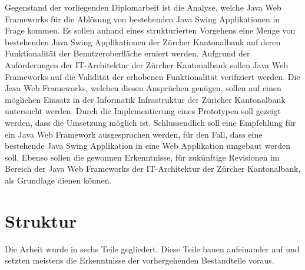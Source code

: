   Gegenstand der vorliegenden Diplomarbeit ist die Analyse, welche Java Web
  Frameworks für die Ablösung von bestehenden Java Swing Applikationen in Frage
  kommen. Es sollen anhand eines strukturierten Vorgehens eine Menge von
  bestehenden Java Swing Applikationen der Zürcher Kantonalbank auf deren
  Funktionalität der Benutzeroberfläche eruiert werden. Aufgrund der
  Anforderungen der IT-Architektur der Zürcher Kantonalbank sollen Java Web
  Frameworks auf die Validität der erhobenen Funktionalität verifiziert
  werden. Die Java Web Frameworks, welchen diesen Ansprüchen genügen, sollen
  auf einen möglichen Einsatz in der Informatik Infrastruktur der Züricher
  Kantonalbank untersucht werden. Durch die Implementierung eines Prototypen
  soll gezeigt werden, dass die Umsetzung möglich ist. Schlussendlich soll eine
  Empfehlung für ein Java Web Framework ausgesprochen werden, für den Fall,
  dass eine bestehende Java Swing Applikation in eine Web Applikation umgebaut
  werden soll. Ebenso sollen die gewonnen Erkenntnisse, für zukünftige
  Revisionen im Bereich der Java Web Frameworks der IT-Architektur der
  Zürcher Kantonalbank, als Grundlage dienen können.
  
  \section{Struktur}
  
  Die Arbeit wurde in sechs Teile gegliedert. Diese Teile bauen aufeinander auf
  und setzten meistens die Erkenntnisse der vorhergehenden Bestandteile voraus.
  
